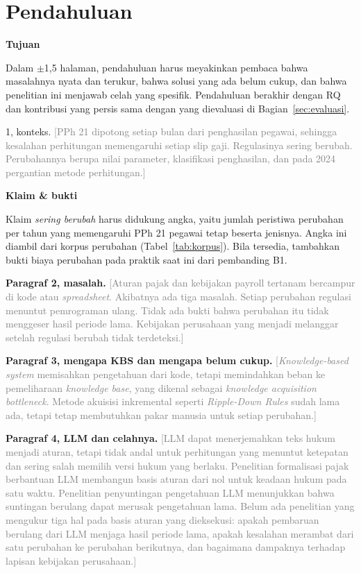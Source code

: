 \documentclass[journal,a4paper]{IEEEtran}
\newcommand{\en}[1]{\textit{#1}}
\newif\ifrancangan \rancangantrue
\newcommand{\kotak}[3]{\ifrancangan\par\begingroup\scriptsize
  \def\FrameCommand{\fboxsep=3pt\fboxrule=0.4pt\fcolorbox{#1!60!black}{#1!6}}%
  \MakeFramed{\advance\hsize-\width\FrameRestore}\noindent\textbf{#2}\par #3\endMakeFramed\endgroup\fi}
\newcommand{\tujuan}[1]{\kotak{blue}{Tujuan}{#1}}
\newcommand{\klaim}[1]{\kotak{green}{Klaim \& bukti}{#1}}
\newcommand{\isian}[1]{\ifrancangan\textcolor{gray}{[#1]}\fi}
\begin{document}
\section{Pendahuluan}
\label{sec:pendahuluan}
\tujuan{Dalam $\pm$1,5 halaman, pendahuluan harus meyakinkan pembaca bahwa masalahnya nyata dan terukur, bahwa solusi yang ada belum cukup, dan bahwa penelitian ini menjawab celah yang spesifik. Pendahuluan berakhir dengan RQ dan kontribusi yang persis sama dengan yang dievaluasi di Bagian~\ref{sec:evaluasi}.}

 1, konteks. \isian{PPh 21 dipotong setiap bulan dari penghasilan pegawai, sehingga kesalahan perhitungan memengaruhi setiap slip gaji. Regulasinya sering berubah. Perubahannya berupa nilai parameter, klasifikasi penghasilan, dan pada 2024 pergantian metode perhitungan.}

\klaim{Klaim \emph{sering berubah} harus didukung angka, yaitu jumlah peristiwa perubahan per tahun yang memengaruhi PPh 21 pegawai tetap beserta jenisnya. Angka ini diambil dari korpus perubahan (Tabel~\ref{tab:korpus}). Bila tersedia, tambahkan bukti biaya perubahan pada praktik saat ini dari pembanding B1.}

\textbf{Paragraf 2, masalah.} \isian{Aturan pajak dan kebijakan payroll tertanam bercampur di kode atau \en{spreadsheet}. Akibatnya ada tiga masalah. Setiap perubahan regulasi menuntut pemrograman ulang. Tidak ada bukti bahwa perubahan itu tidak menggeser hasil periode lama. Kebijakan perusahaan yang menjadi melanggar setelah regulasi berubah tidak terdeteksi.}

\textbf{Paragraf 3, mengapa KBS dan mengapa belum cukup.} \isian{\en{Knowledge-based system} memisahkan pengetahuan dari kode, tetapi memindahkan beban ke pemeliharaan \en{knowledge base}, yang dikenal sebagai \en{knowledge acquisition bottleneck}. Metode akuisisi inkremental seperti \en{Ripple-Down Rules} sudah lama ada, tetapi tetap membutuhkan pakar manusia untuk setiap perubahan.}

\textbf{Paragraf 4, LLM dan celahnya.} \isian{LLM dapat menerjemahkan teks hukum menjadi aturan, tetapi tidak andal untuk perhitungan yang menuntut ketepatan dan sering salah memilih versi hukum yang berlaku. Penelitian formalisasi pajak berbantuan LLM membangun basis aturan dari nol untuk keadaan hukum pada satu waktu. Penelitian penyuntingan pengetahuan LLM menunjukkan bahwa suntingan berulang dapat merusak pengetahuan lama. Belum ada penelitian yang mengukur tiga hal pada basis aturan yang dieksekusi: apakah pembaruan berulang dari LLM menjaga hasil periode lama, apakah kesalahan merambat dari satu perubahan ke perubahan berikutnya, dan bagaimana dampaknya terhadap lapisan kebijakan perusahaan.}
\end{document}
